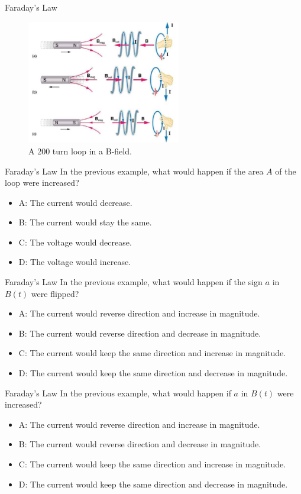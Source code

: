 \documentclass{beamer}
\begin{document}
\begin{frame}{Faraday's Law}
\begin{figure}
\centering
\includegraphics[width=0.6\textwidth]{figures/lenzspecific.png}
\caption{\label{fig:lenz11} A 200 turn loop in a B-field.}
\end{figure}
\end{frame}

\begin{frame}{Faraday's Law}
In the previous example, what would happen if the area $A$ of the loop were increased?
\begin{itemize}
\item A: The current would decrease.
\item B: The current would stay the same.
\item C: The voltage would decrease.
\item D: The voltage would increase.
\end{itemize}
\end{frame}

\begin{frame}{Faraday's Law}
In the previous example, what would happen if the sign $a$ in $B(t)$ were flipped?
\begin{itemize}
\item A: The current would reverse direction and increase in magnitude.
\item B: The current would reverse direction and decrease in magnitude.
\item C: The current would keep the same direction and increase in magnitude.
\item D: The current would keep the same direction and decrease in magnitude.
\end{itemize}
\end{frame}

\begin{frame}{Faraday's Law}
In the previous example, what would happen if $a$ in $B(t)$ were increased?
\begin{itemize}
\item A: The current would reverse direction and increase in magnitude.
\item B: The current would reverse direction and decrease in magnitude.
\item C: The current would keep the same direction and increase in magnitude.
\item D: The current would keep the same direction and decrease in magnitude.
\end{itemize}
\end{frame}
\end{document}
